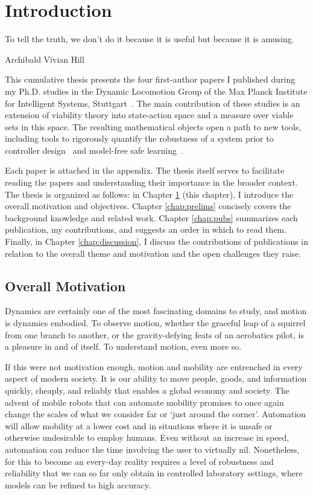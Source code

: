 
\chapter{Introduction} \label{chap:intro}
\epigraph{To tell the truth, we don't do it because it is useful but because it is amusing.}{Archibald Vivian Hill}

This cumulative thesis presents the four first-author papers I published during my Ph.D. studies in the Dynamic Locomotion Group of the Max Planck Institute for Intelligent Systems, Stuttgart~\cite{heim2018shaping,heim2019beyond,heim2019learnable,heim2018unviable}. The main contribution of these studies is an extension of viability theory into state-action space and a measure over viable sets in this space.
The resulting mathematical objects open a path to new tools, including tools to rigorously quantify the robustness of a system prior to controller design~\cite{heim2019beyond} and model-free safe learning~\cite{heim2019learnable}. \par
Each paper is attached in the appendix. The thesis itself serves to facilitate reading the papers and understanding their importance in the broader context. The thesis is organized as follows: in Chapter \ref{chap:intro} (this chapter), I introduce the overall motivation and objectives.
Chapter \ref{chap:prelims} concisely covers the background knowledge and related work.
Chapter \ref{chap:pubs} summarizes each publication, my contributions, and suggests an order in which to read them.
Finally, in Chapter \ref{chap:discussion}, I discuss the contributions of publications in relation to the overall theme and motivation and the open challenges they raise.

\section{Overall Motivation}

Dynamics are certainly one of the most fascinating domains to study, and motion is dynamics embodied. To observe motion, whether the graceful leap of a squirrel from one branch to another, or the gravity-defying feats of an aerobatics pilot, is a pleasure in and of itself. To understand motion, even more so. \par

If this were not motivation enough, motion and mobility are entrenched in every aspect of modern society. It is our ability to move people, goods, and information quickly, cheaply, and reliably that enables a global economy and society. The advent of mobile robots that can automate mobility promises to once again change the scales of what we consider far or `just around the corner'. Automation will allow mobility at a lower cost and in situations where it is unsafe or otherwise undesirable to employ humans. Even without an increase in speed, automation can reduce the time involving the user to virtually nil. Nonetheless, for this to become an every-day reality requires a level of robustness and reliability that we can so far only obtain in controlled laboratory settings, where models can be refined to high accuracy. \par

